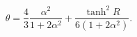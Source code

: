 \begin{equation}
\theta= \frac{4}{3}\frac{\alpha^2}{1+2\alpha^2}+ \frac{\tanh^2 R}{6(1+2\alpha^2)}.
\end{equation}

